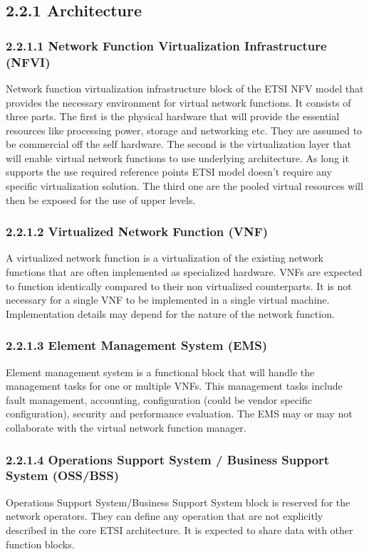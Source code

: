 \documentclass[12pt,oneandhalf,chaparabic,ceng,ms,eng,oneside,pntc]{gsufbe}
\begin{document}
\subsection[Architecture]{2.2.1 Architecture}
\subsubsection[Network Function Virtualization Infrastructure (NFVI)]{2.2.1.1 Network Function Virtualization Infrastructure (NFVI)}
Network function virtualization infrastructure block of the ETSI NFV model that provides the necessary
environment for virtual network functions.  It consists of three parts.  The first is the physical hardware
that will provide the essential resources like processing power, storage and networking etc.  They are
assumed to be commercial off the self hardware.  The second is the virtualization layer that will enable
virtual network functions to use underlying architecture.  As long it supports the use required reference
points ETSI model doesn't require any specific virtualization solution.  The third one
are the pooled virtual resources will then be exposed for the use of upper levels.

\subsubsection[Virtualized Network Function (VNF)]{2.2.1.2 Virtualized Network Function (VNF)}
A virtualized network function is a virtualization of the existing network functions that are often
implemented as specialized hardware.  VNFs are expected to function identically compared to their non 
virtualized counterparts.  It is not necessary for a single VNF to be implemented in a single virtual
machine.  Implementation details may depend for the nature of the network function.

\subsubsection[Element Management System (EMS)]{2.2.1.3 Element Management System (EMS)}
Element management system is a functional block that will handle the management tasks for one or
multiple VNFs.  This management tasks include fault management, accounting, configuration (could be 
vendor specific configuration), security and performance evaluation.  The EMS may or may not collaborate
with the virtual network function manager.

\subsubsection[Operations Support System / Business Support System (OSS/BSS)]{2.2.1.4 Operations Support System / Business Support System (OSS/BSS)}
Operations Support System/Business Support System block is reserved for the network
operators.  They can define any operation that are not explicitly described in the core
ETSI architecture.  It is expected to share data with other function blocks.
\end{document}
